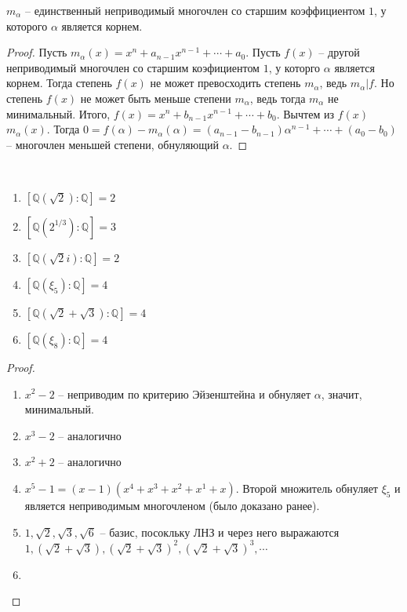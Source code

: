 \documentclass{article}
\begin{document}
\begin{statement}
    $m_{\alpha}$ -- единственный неприводимый многочлен со старшим коэффициентом $1$, у которого $\alpha$ является
    корнем.
\end{statement}

\begin{proof}
    Пусть $m_{\alpha}(x) = x^n + a_{n - 1} x^{n - 1} + \cdots + a_0$. Пусть $f(x)$ -- другой неприводимый многочлен со старшим
    коэфициентом $1$, у которго $\alpha$ является корнем. Тогда степень $f(x)$ не может превосходить степень
    $m_{\alpha}$, ведь $m_{\alpha} | f$. Но степень $f(x)$ не может быть меньше степени $m_{\alpha}$, ведь тогда
    $m_{\alpha}$ не минимальный. Итого, $f(x) = x^{n} + b_{n - 1}x^{n - 1} + \cdots + b_0$. Вычтем из $f(x)$
    $m_{\alpha}(x)$. Тогда $0 = f(\alpha) - m_{\alpha}(\alpha) = (a_{n -1 } - b_{n - 1}) \alpha^{n - 1} + \cdots + (a_0
    - b_0)$ -- многочлен меньшей степени, обнуляющий $\alpha$.
\end{proof}

\begin{statement}
    ~\begin{enumerate}
        \item $[\mathbb{Q}(\sqrt{2}) : \mathbb{Q}] = 2$
        \item $[\mathbb{Q}(2^{1/3}): \mathbb{Q}] = 3$
        \item $[\mathbb{Q}(\sqrt{2}i): \mathbb{Q}] = 2$
        \item $[\mathbb{Q}(\xi_5): \mathbb{Q}] = 4$
        \item $[\mathbb{Q}(\sqrt{2} + \sqrt{3}): \mathbb{Q}] = 4$
        \item $[\mathbb{Q}(\xi_8) : \mathbb{Q}] = 4$
    \end{enumerate}
\end{statement}

\begin{proof}
    \begin{enumerate}
        \item $x^2 - 2$ -- неприводим по критерию Эйзенштейна и обнуляет $\alpha$, значит, минимальный.
        \item $x^3 - 2$ -- аналогично
        \item $x^2 + 2$ -- аналогично
        \item $x^5 - 1 = (x - 1) (x^4 + x^3 + x^2 + x^1 + x)$. Второй множитель обнуляет $\xi_5$ и является неприводимым
            многочленом (было доказано ранее).
        \item $1, \sqrt{2}, \sqrt{3}, \sqrt{6}$ -- базис, посокльку ЛНЗ и через него выражаются $1, (\sqrt{2} +
            \sqrt{3}), (\sqrt{2} + \sqrt{3})^2, (\sqrt{2} + \sqrt{3})^3, \cdots$
        \item 
    \end{enumerate}
\end{proof}
\end{document}

